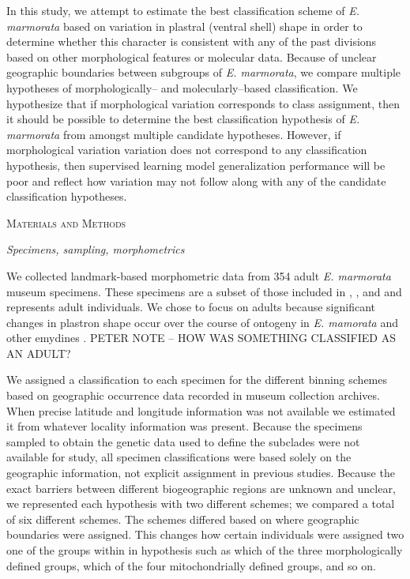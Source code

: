 \documentclass[12pt,letterpaper]{article}
\renewcommand{\section}[1]{%
\bigskip
\begin{center}
\begin{Large}
\normalfont\scshape #1
\medskip
\end{Large}
\end{center}}
\renewcommand{\subsection}[1]{%
\bigskip
\begin{center}
\begin{large}
\normalfont\itshape #1
\end{large}
\end{center}}
\begin{document}
In this study, we attempt to estimate the best classification scheme of \textit{E. marmorata} based on variation in plastral (ventral shell) shape in order to determine whether this character is consistent with any of the past divisions based on other morphological features or molecular data. Because of unclear geographic boundaries between subgroups of \textit{E. marmorata}, we compare multiple hypotheses of morphologically-- and molecularly--based classification. We hypothesize that if morphological variation corresponds to class assignment, then it should be possible to determine the best classification hypothesis of \textit{E. marmorata} from amongst multiple candidate hypotheses. However, if morphological variation variation does not correspond to any classification hypothesis, then supervised learning model generalization performance will be poor and reflect how variation may not follow along with any of the candidate classification hypotheses.


\section{Materials and Methods}
\subsection{Specimens, sampling, morphometrics}
We collected landmark-based morphometric data from 354 adult \textit{E. marmorata} museum specimens. These specimens are a subset of those included in \citet{Angielczyk2007}, \citet{Angielczyk2011}, and \citet{Angielczyk2013a} and represents adult individuals. We chose to focus on adults because significant changes in plastron shape occur over the course of ontogeny in \textit{E. mamorata} and other emydines \citep{Angielczyk2013a}. \uppercase{Peter note -- how was something classified as an adult?}

We assigned a classification to each specimen for the different binning schemes based on geographic occurrence data recorded in museum collection archives. When precise latitude and longitude information was not available we estimated it from whatever locality information was present. Because the specimens sampled to obtain the genetic data used to define the subclades were not available for study, all specimen classifications were based solely on the geographic information, not explicit assignment in previous studies. Because the exact barriers between different biogeographic regions are unknown and unclear, we represented each hypothesis with two different schemes; we compared a total of six different schemes. The schemes differed based on where geographic boundaries were assigned. This changes how certain individuals were assigned two one of the groups within in hypothesis such as which of the three morphologically defined groups, which of the four mitochondrially defined groups, and so on. %
\end{document}
